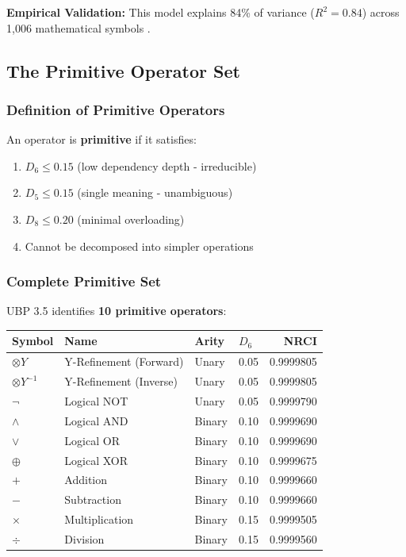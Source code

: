 \textbf{Empirical Validation:} This model explains 84\% of variance ($R^2 = 0.84$) across 1,006 mathematical symbols \cite{Symbol_Study}.

\subsection{The Primitive Operator Set}

\subsubsection{Definition of Primitive Operators}

An operator is \textbf{primitive} if it satisfies:

\begin{enumerate}
    \item $D_6 \leq 0.15$ (low dependency depth - irreducible)
    \item $D_5 \leq 0.15$ (single meaning - unambiguous)
    \item $D_8 \leq 0.20$ (minimal overloading)
    \item Cannot be decomposed into simpler operations
\end{enumerate}

\subsubsection{Complete Primitive Set}

UBP 3.5 identifies \textbf{10 primitive operators}:

\begin{table}[h]
\centering
\begin{tabular}{llllr}
\toprule
\textbf{Symbol} & \textbf{Name} & \textbf{Arity} & \textbf{$D_6$} & \textbf{NRCI} \\
\midrule
$\otimes Y$ & Y-Refinement (Forward) & Unary & 0.05 & 0.9999805 \\
$\otimes Y^{-1}$ & Y-Refinement (Inverse) & Unary & 0.05 & 0.9999805 \\
$\neg$ & Logical NOT & Unary & 0.05 & 0.9999790 \\
$\land$ & Logical AND & Binary & 0.10 & 0.9999690 \\
$\lor$ & Logical OR & Binary & 0.10 & 0.9999690 \\
$\oplus$ & Logical XOR & Binary & 0.10 & 0.9999675 \\
$+$ & Addition & Binary & 0.10 & 0.9999660 \\
$-$ & Subtraction & Binary & 0.10 & 0.9999660 \\
$\times$ & Multiplication & Binary & 0.15 & 0.9999505 \\
$\div$ & Division & Binary & 0.15 & 0.9999560 \\
\bottomrule
\end{tabular}
\end{table}

